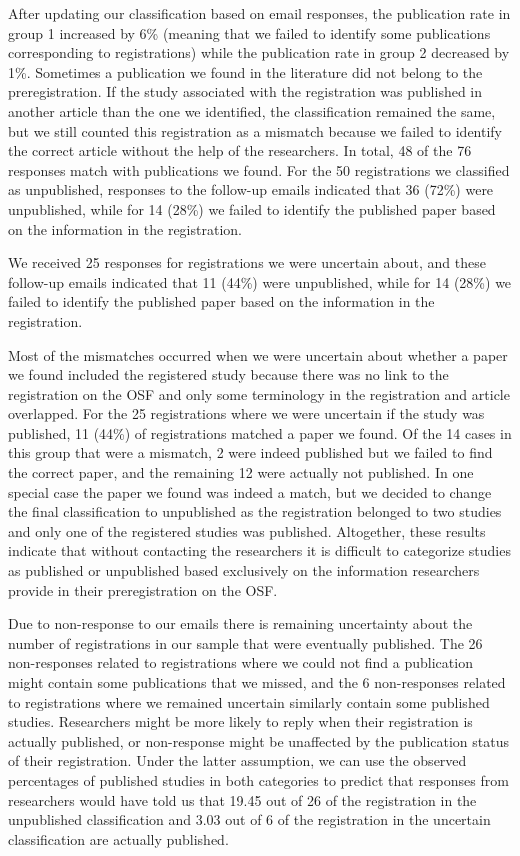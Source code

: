 \documentclass[
  ,jou, a4paper,floatsintext]{apa6}
\begin{document}
After updating our classification based on email responses, the publication rate in group 1 increased by 6\% (meaning that we failed to identify some publications corresponding to registrations) while the publication rate in group 2 decreased by 1\%. Sometimes a publication we found in the literature did not belong to the preregistration. If the study associated with the registration was published in another article than the one we identified, the classification remained the same, but we still counted this registration as a mismatch because we failed to identify the correct article without the help of the researchers. In total, 48 of the 76 responses match with publications we found. For the 50 registrations we classified as unpublished, responses to the follow-up emails indicated that 36 (72\%) were unpublished, while for 14 (28\%) we failed to identify the published paper based on the information in the registration.

We received 25 responses for registrations we were uncertain about, and these follow-up emails indicated that 11 (44\%) were unpublished, while for 14 (28\%) we failed to identify the published paper based on the information in the registration.

Most of the mismatches occurred when we were uncertain about whether a paper we found included the registered study because there was no link to the registration on the OSF and only some terminology in the registration and article overlapped. For the 25 registrations where we were uncertain if the study was published, 11 (44\%) of registrations matched a paper we found. Of the 14 cases in this group that were a mismatch, 2 were indeed published but we failed to find the correct paper, and the remaining 12 were actually not published. In one special case the paper we found was indeed a match, but we decided to change the final classification to unpublished as the registration belonged to two studies and only one of the registered studies was published. Altogether, these results indicate that without contacting the researchers it is difficult to categorize studies as published or unpublished based exclusively on the information researchers provide in their preregistration on the OSF.

Due to non-response to our emails there is remaining uncertainty about the number of registrations in our sample that were eventually published. The 26 non-responses related to registrations where we could not find a publication might contain some publications that we missed, and the 6 non-responses related to registrations where we remained uncertain similarly contain some published studies. Researchers might be more likely to reply when their registration is actually published, or non-response might be unaffected by the publication status of their registration. Under the latter assumption, we can use the observed percentages of published studies in both categories to predict that responses from researchers would have told us that 19.45 out of 26 of the registration in the unpublished classification and 3.03 out of 6 of the registration in the uncertain classification are actually published.
\end{document}
